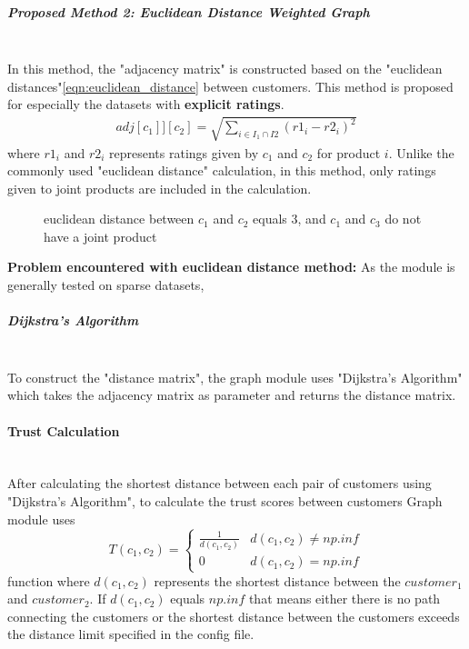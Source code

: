 	\subparagraph{Proposed Method 2: Euclidean Distance Weighted Graph}\mbox{}\\
	In this method, the "adjacency matrix" is constructed based on the "euclidean distances"\ref{eqn:euclidean_distance} between customers. This method is proposed for especially the datasets with \textbf{explicit ratings}.
	\begin{equation} 
	\label{eqn:euclidean_distance}
	\begin{split}
	adj[c_{1}]][c_{2}] = \sqrt{\sum_{i\in I_{1}\cap I{2}}^{} (r1_{i}-r2_{i})^2}
	\end{split}
	\end{equation}
	where $r1_{i}$ and $r2_{i}$ represents ratings given by $c_{1}$ and $c_{2}$ for product $i$. Unlike the commonly used "euclidean distance" calculation, in this method, only ratings given to joint products are included in the calculation.
	\begin{figure}[H]
		\centering
		\caption{euclidean distance between $c_{1}$ and $c_{2}$ equals 3, and $c_{1}$ and $c_{3}$ do not have a joint product}
	\end{figure}
	\textbf{Problem encountered with euclidean distance method:} As the module is generally tested on sparse datasets, 
	
	\subparagraph{Dijkstra's Algorithm}\mbox{}\\
	To construct the "distance matrix", the graph module uses "Dijkstra's Algorithm"\cite{Dijkstra} which takes the adjacency matrix as parameter and returns the distance matrix.
	
	\paragraph{Trust Calculation}\mbox{}\\
	After calculating the shortest distance between each pair of customers using "Dijkstra's Algorithm", to calculate the trust scores between customers Graph module uses
	\begin{equation*} 
	T(c_{1}, c_{2})= \left\{
	\begin{array}{lr} 
	\frac{1}{d(c_{1}, c_{2})} & d(c_{1}, c_{2}) \neq np.inf \\
	0 & d(c_{1}, c_{2}) = np.inf
	\end{array}
	\right.
	\end{equation*}
	function where $d(c_{1}, c_{2})$ represents the shortest distance between the $customer_{1}$ and $customer_{2}$. If $d(c_{1}, c_{2})$ equals $np.inf$ that means either there is no path connecting the customers or the shortest distance between the customers exceeds the distance limit specified in the config file. \\
	
